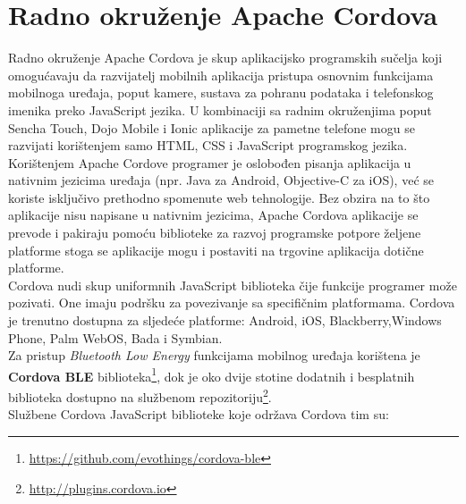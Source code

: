 \chapter{Radno okruženje Apache Cordova}
\label{chap:radnoOkruzenje}

Radno okruženje Apache Cordova je skup aplikacijsko programskih sučelja  koji omogućavaju da razvijatelj mobilnih aplikacija pristupa osnovnim funkcijama mobilnoga uređaja, poput kamere, sustava za pohranu podataka i telefonskog imenika preko JavaScript jezika. 
U kombinaciji sa radnim okruženjima poput Sencha Touch, Dojo Mobile i Ionic aplikacije za pametne telefone mogu se razvijati korištenjem samo HTML, CSS i JavaScript programskog jezika.
\\

Korištenjem Apache Cordove programer je oslobođen pisanja aplikacija u nativnim jezicima uređaja (npr. Java za Android, Objective-C za iOS), već se koriste isključivo prethodno spomenute web tehnologije. 
Bez obzira na to što aplikacije nisu napisane u nativnim jezicima, Apache Cordova aplikacije se prevode i pakiraju pomoću biblioteke za razvoj programske potpore  željene platforme stoga se aplikacije mogu i postaviti na trgovine aplikacija  dotične platforme. 
\\

Cordova nudi skup uniformnih JavaScript biblioteka čije funkcije programer može pozivati. 
One imaju podršku za povezivanje sa specifičnim platformama. Cordova je trenutno dostupna za sljedeće platforme: Android, iOS, Blackberry,Windows Phone, Palm WebOS, Bada i Symbian.
\\

Za pristup \textit{Bluetooth Low Energy} funkcijama mobilnog uređaja korištena je \textbf{Cordova BLE} biblioteka\footnote{\url{https://github.com/evothings/cordova-ble}}, dok je oko dvije stotine dodatnih i besplatnih biblioteka dostupno na službenom repozitoriju\footnote{\url{http://plugins.cordova.io}}.
\\
Službene Cordova JavaScript biblioteke koje održava Cordova tim su:

